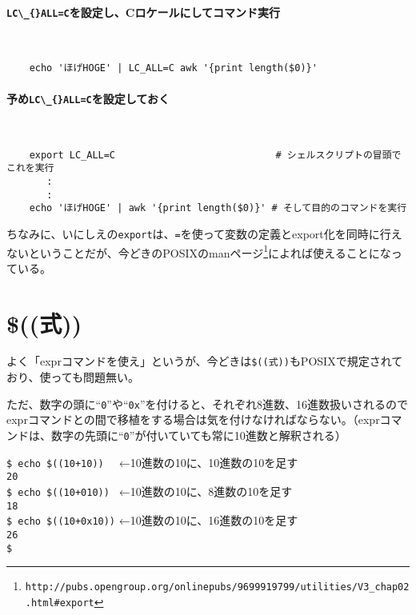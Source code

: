 \paragraph*{\verb|LC\_{}ALL=C|を設定し、Cロケールにしてコマンド実行} 　\\
\begin{frameboxit}{160.0mm}
\begin{verbatim}
	echo 'ほげHOGE' | LC_ALL=C awk '{print length($0)}'
\end{verbatim}
\end{frameboxit}

\paragraph*{予め\verb|LC\_{}ALL=C|を設定しておく} 　\\
\begin{frameboxit}{160.0mm}
\begin{verbatim}
	export LC_ALL=C                            # シェルスクリプトの冒頭でこれを実行
	   :
	   :
	echo 'ほげHOGE' | awk '{print length($0)}' # そして目的のコマンドを実行
\end{verbatim}
\end{frameboxit}

ちなみに、いにしえの\verb|export|は、\verb|=|を使って変数の定義とexport化を同時に行えないということだが、今どきのPOSIXのmanページ\footnote{\verb|http://pubs.opengroup.org/onlinepubs/9699919799/utilities/V3_chap02.html#export|}によれば使えることになっている。

\section{\$((式))}

よく「exprコマンドを使え」というが、今どきは\verb|$((式))|もPOSIXで規定されており、使っても問題無い。

ただ、数字の頭に``\verb|0|''や``\verb|0x|''を付けると、それぞれ8進数、16進数扱いされるのでexprコマンドとの間で移植をする場合は気を付けなければならない。（exprコマンドは、数字の先頭に``\verb|0|''が付いていても常に10進数と解釈される）

\begin{screen}
	\verb|$ echo $((10+10))| \return \verb|  |←10進数の10に、10進数の10を足す \\
	\verb|20| \\
	\verb|$ echo $((10+010))| \return \verb| |←10進数の10に、8進数の10を足す \\
	\verb|18| \\
	\verb|$ echo $((10+0x10))| \return ←10進数の10に、16進数の10を足す \\
	\verb|26| \\
	\verb|$ |
\end{screen}

